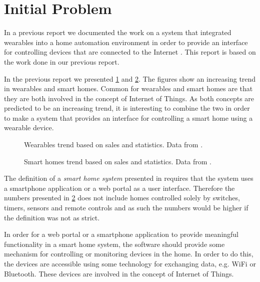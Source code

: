 \section{Initial Problem}
\label{sec:initproblem}

In a previous report we documented the work on a system that integrated wearables into a home automation environment in order to provide an interface for controlling devices that are connected to the Internet \cite{prespecialisation}. This report is based on the work done in our previous report.

In the previous report \cite[pp. 1-4]{prespecialisation} we presented \cref{fig:wearables-trend} and \cref{fig:smarthomestrend}. The figures show an increasing trend in wearables and smart homes. Common for wearables and smart homes are that they are both involved in the concept of Internet of Things. As both concepts are predicted to be an increasing trend, it is interesting to combine the two in order to make a system that provides an interface for controlling a smart home using a wearable device.

\begin{figure}[!hbt]
  \centering
  
  \caption{Wearables trend based on sales and statistics. Data from \protect\cite{WEARABLESTRENDNUMBERS}.}
  \label{fig:wearables-trend}
\end{figure}

\begin{figure}[!hbt]
  \centering
  
  \caption{Smart homes trend based on sales and statistics. Data from \protect\cite{SMARTHOMETREND}.}
  \label{fig:smarthomestrend}
\end{figure}

The definition of a \emph{smart home system} presented in \cite{SMARTHOMETREND} requires that the system uses a smartphone application or a web portal as a user interface. Therefore the numbers presented in \cref{fig:smarthomestrend} does not include homes controlled solely by switches, timers, sensors and remote controls and as such the numbers would be higher if the definition was not as strict.

In order for a web portal or a smartphone application to provide meaningful functionality in a smart home system, the software should provide some mechanism for controlling or monitoring devices in the home. In order to do this, the devices are accessible using some technology for exchanging data, e.g. WiFi or Bluetooth. These devices are involved in the concept of Internet of Things. 

